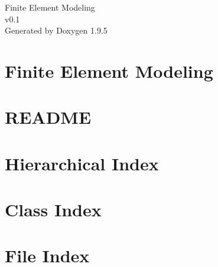 \documentclass[twoside]{book}
\newcommand{\+}{\discretionary{\mbox{\scriptsize$\hookleftarrow$}}{}{}}
\newcommand{\clearemptydoublepage}{%
    \newpage{\pagestyle{empty}\cleardoublepage}%
  }
\begin{document}
  \raggedbottom
    \hypersetup{pageanchor=false,
                bookmarksnumbered=true,
                pdfencoding=unicode
               }
  \begin{titlepage}
  \vspace*{7cm}
  \begin{center}%
  {\Large Finite Element Modeling}\\
  [1ex]\large v0.\+1 \\
  \vspace*{1cm}
  {\large Generated by Doxygen 1.9.5}\\
  \end{center}
  \end{titlepage}
  \clearemptydoublepage
  \tableofcontents
  \clearemptydoublepage
  \hypersetup{pageanchor=true}
\chapter{Finite Element Modeling}
\label{index}\hypertarget{index}{}
\chapter{README}
\label{md__c___projects__f_e_m_831_finite_element_modeling__r_e_a_d_m_e}

\chapter{Hierarchical Index}

\chapter{Class Index}

\chapter{File Index}

\end{document}
